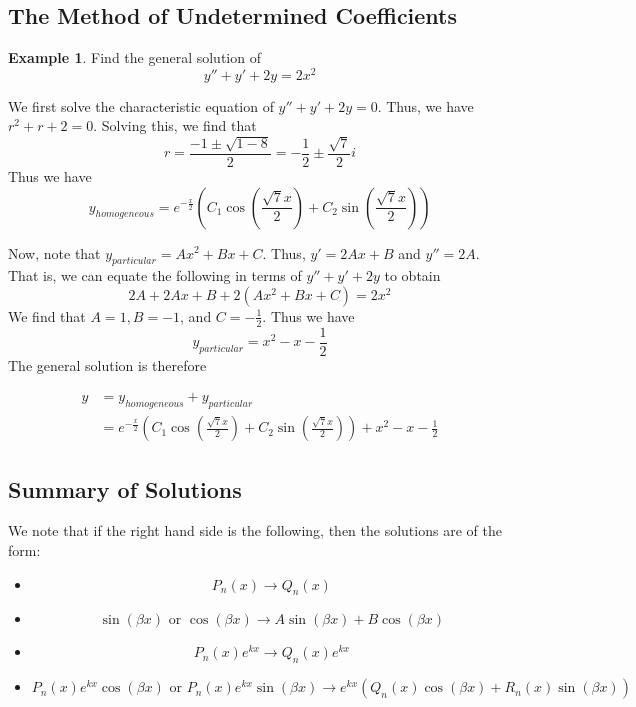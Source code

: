 \documentclass[11pt]{article}
\theoremstyle{plain} %
\theoremstyle{definition}
\theoremstyle{example}
\newtheorem*{example}{Example}
\theoremstyle{remark}
\begin{document}
\subsection{The Method of Undetermined Coefficients}

\begin{example}
Find the general solution of $$y'' + y' + 2y = 2x^2$$
\end{example}

We first solve the characteristic equation of $y'' + y' + 2y = 0$. Thus, we have $r^2+r+2=0$. Solving this, we find that $$r = \frac{-1 \pm \sqrt{1-8}}{2} = -\frac{1}{2} \pm \frac{\sqrt{7}}{2}i$$ Thus we have $$y_{homogeneous} = e^{-\frac{x}{2}}\left(C_1\cos\left(\frac{\sqrt{7}x}{2}\right) + C_2\sin\left(\frac{\sqrt{7}x}{2}\right) \right)$$


Now, note that $y_{particular} = Ax^2 + Bx + C$. Thus, $y' = 2Ax + B$ and $y'' = 2A$. That is, we can equate the following in terms of $y'' + y' + 2y$ to obtain
$$2A + 2Ax + B + 2\left(Ax^2+Bx + C \right)= 2x^2$$ We find that $A = 1, B = -1$, and $C  = -\frac{1}{2}$. Thus we have $$y_{particular} = x^2-x-\frac{1}{2}$$ The general solution is therefore 

\begin{align*}
y &= y_{homogeneous} + y_{particular} \\
&=  e^{-\frac{x}{2}}\left(C_1\cos\left(\frac{\sqrt{7}x}{2}\right) + C_2\sin\left(\frac{\sqrt{7}x}{2}\right) \right) + x^2-x-\frac{1}{2}
\end{align*}


\subsection{Summary of Solutions}

We note that if the right hand side is the following, then the solutions are of the form:

\begin{itemize}
	\item $$P_n(x) \rightarrow Q_n(x)$$
	\item $$\sin(\beta x) \text{ or } \cos(\beta x) \rightarrow A\sin(\beta x) + B\cos(\beta x)$$
	\item $$P_n(x)e^{kx} \rightarrow Q_n(x)e^{kx}$$
	\item $$P_n(x)e^{kx}\cos(\beta x) \text{ or } P_n(x)e^{kx}\sin(\beta x)\rightarrow e^{kx}\left(Q_n(x)\cos(\beta x) + R_n(x)\sin(\beta x)\right)$$
\end{itemize}
\end{document}
